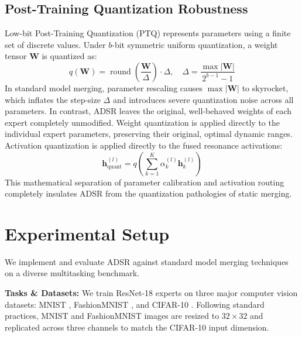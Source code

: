\documentclass{article}
\theoremstyle{plain}
\theoremstyle{definition}
\theoremstyle{remark}
\begin{document}
    \subsection{Post-Training Quantization Robustness}
Low-bit Post-Training Quantization (PTQ) represents parameters using a finite set of discrete values. Under $b$-bit symmetric uniform quantization, a weight tensor $\mathbf{W}$ is quantized as:
\begin{equation}
    q(\mathbf{W}) = \operatorname{round}\left( \frac{\mathbf{W}}{\Delta} \right) \cdot \Delta, \quad \Delta = \frac{\max |\mathbf{W}|}{2^{b-1} - 1}
\end{equation}
In standard model merging, parameter rescaling causes $\max |\mathbf{W}|$ to skyrocket, which inflates the step-size $\Delta$ and introduces severe quantization noise across all parameters. In contrast, ADSR leaves the original, well-behaved weights of each expert completely unmodified. Weight quantization is applied directly to the individual expert parameters, preserving their original, optimal dynamic ranges. Activation quantization is applied directly to the fused resonance activations:
\begin{equation}
    \mathbf{h}^{(l)}_{\text{quant}} = q\left( \sum_{k=1}^K \alpha_k^{(l)} \mathbf{h}_k^{(l)} \right)
\end{equation}
This mathematical separation of parameter calibration and activation routing completely insulates ADSR from the quantization pathologies of static merging.

\section{Experimental Setup}
We implement and evaluate ADSR against standard model merging techniques on a diverse multitasking benchmark.

\textbf{Tasks \& Datasets:} We train ResNet-18 experts on three major computer vision datasets: MNIST \cite{lecun98mnist}, FashionMNIST \cite{xiao17fashionmnist}, and CIFAR-10 \cite{krizhevsky09cifar}. Following standard practices, MNIST and FashionMNIST images are resized to $32 \times 32$ and replicated across three channels to match the CIFAR-10 input dimension.
\end{document}
